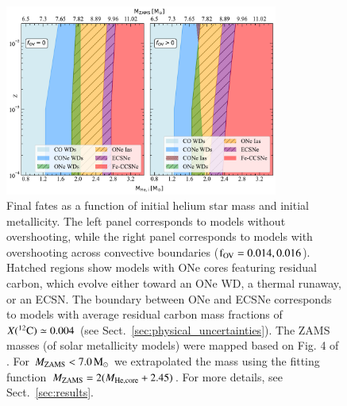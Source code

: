 \documentclass[main.tex]{subfiles}
\begin{document}
\begin{figure}[h!]
    \centering
    \includegraphics[width=0.8\textwidth]{figures/chapter2/final_fates/final_fates_graph_with_farmers_zams.pdf}
    \caption{Final fates as a function of initial helium star mass and initial metallicity. The left panel corresponds to models without overshooting, while the right panel corresponds to models with overshooting across convective boundaries ($\rm f_{OV} = 0.014, 0.016$). Hatched regions show models with ONe cores featuring residual carbon, which evolve either toward an ONe WD, a thermal runaway, or an ECSN.
    The boundary between ONe \ias and ECSNe corresponds to models with average residual carbon mass fractions of $X(\iso{C}{12}) \simeq 0.004$ (see Sect.~\ref{sec:physical_uncertainties}). 
    The ZAMS masses (of solar metallicity models) were mapped based on Fig. 4 of  \cite{Farmer:2015afs}. For $M_{\rm ZAMS} < 7.0\msun$ we extrapolated the mass using the fitting function $M_{\rm ZAMS} = 2(M_{\rm He, core} + 2.45)$. For more details, see Sect.~\ref{sec:results}.}
    \label{fig:final_fates}
\end{figure}
\end{document}
